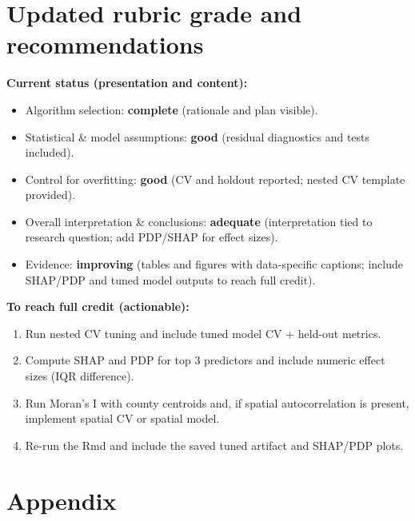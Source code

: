 \documentclass[
  11pt,
]{article}
\providecommand{\tightlist}{%
  \setlength{\itemsep}{0pt}\setlength{\parskip}{0pt}}
\begin{document}
\newpage

\section{Updated rubric grade and
recommendations}\label{updated-rubric-grade-and-recommendations}

\textbf{Current status (presentation and content):}

\begin{itemize}
\tightlist
\item
  Algorithm selection: \textbf{complete} (rationale and plan visible).\\
\item
  Statistical \& model assumptions: \textbf{good} (residual diagnostics
  and tests included).\\
\item
  Control for overfitting: \textbf{good} (CV and holdout reported;
  nested CV template provided).\\
\item
  Overall interpretation \& conclusions: \textbf{adequate}
  (interpretation tied to research question; add PDP/SHAP for effect
  sizes).\\
\item
  Evidence: \textbf{improving} (tables and figures with data-specific
  captions; include SHAP/PDP and tuned model outputs to reach full
  credit).
\end{itemize}

\textbf{To reach full credit (actionable):}

\begin{enumerate}
\def\labelenumi{\arabic{enumi}.}
\tightlist
\item
  Run nested CV tuning and include tuned model CV + held-out metrics.\\
\item
  Compute SHAP and PDP for top 3 predictors and include numeric effect
  sizes (IQR difference).\\
\item
  Run Moran's I with county centroids and, if spatial autocorrelation is
  present, implement spatial CV or spatial model.\\
\item
  Re-run the Rmd and include the saved tuned artifact and SHAP/PDP
  plots.
\end{enumerate}

\newpage

\section{Appendix}\label{appendix}
\end{document}
